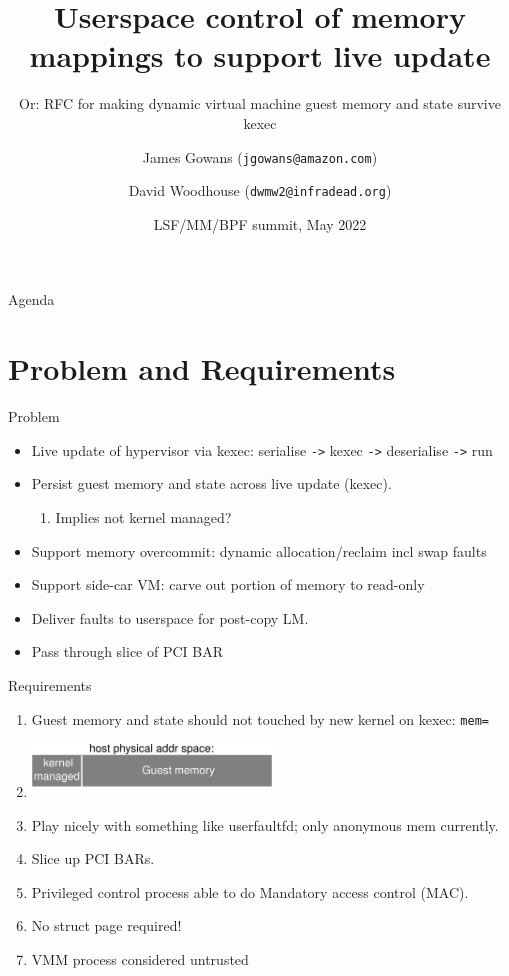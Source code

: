 \documentclass{beamer}
\title{Userspace control of memory mappings to support live update}
\subtitle{Or: RFC for making dynamic virtual machine guest memory and state survive kexec}
\author[James Gowans \& David Woodhouse (EC2) ]{James Gowans (\texttt{jgowans@amazon.com}) \\ \and David Woodhouse (\texttt{dwmw2@infradead.org})}
\institute{Amazon / AWS / EC2}
\date{LSF/MM/BPF summit, May 2022}
\begin{document}
\begin{frame}
\titlepage
\end{frame}


\begin{frame}{Agenda}
  \tableofcontents[hideallsubsections]
\end{frame}


\section{Problem and Requirements}

\begin{frame}{Problem}
  \begin{itemize}
    \item Live update of hypervisor via kexec: serialise \texttt{->} kexec \texttt{->} deserialise \texttt{->} run
    \item Persist guest memory and state across live update (kexec).
      \begin{enumerate}
        \item Implies not kernel managed?
      \end{enumerate}
    \item Support memory overcommit: dynamic allocation/reclaim incl swap faults
    \item Support side-car VM: carve out portion of memory to read-only
    \item Deliver faults to userspace for post-copy LM.
    \item Pass through slice of PCI BAR
  \end{itemize}
\end{frame}

\begin{frame}{Requirements}
  \begin{enumerate}
    \item Guest memory and state should not touched by new kernel on kexec: \texttt{mem=}
    \item \includegraphics[width=0.5\textwidth]{memmac-memory}
    \item Play nicely with something like userfaultfd; only anonymous mem currently.
    \item Slice up PCI BARs.
    \item Privileged control process able to do Mandatory access control (MAC).
    \item No struct page required!
    \item VMM process considered untrusted
  \end{enumerate}
\end{frame}
\end{document}
